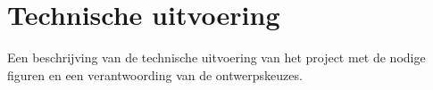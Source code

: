 
\chapter{Technische uitvoering}

Een beschrijving van de technische uitvoering van het project met de
nodige figuren en een verantwoording van de ontwerpskeuzes.

